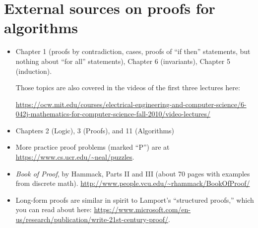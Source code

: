 
\section{External sources on proofs for algorithms}

\begin{itemize}
\item
  \LLM
  Chapter 1 (proofs by contradiction, cases, proofs of ``if then'' statements, but nothing about ``for all'' statements),
  Chapter 6 (invariants),
  Chapter 5 (induction).

  Those topics are also covered in the videos of the first three lectures here:

  \parbox{0.9\textwidth}  {\url{https://ocw.mit.edu/courses/electrical-engineering-and-computer-science/6-042j-mathematics-for-computer-science-fall-2010/video-lectures/}}

\item \MF Chapters 2 (Logic), 3 (Proofs), and 11 (Algorithms)

\item More practice proof problems (marked ``P'') are at
  \url{https://www.cs.ucr.edu/~neal/puzzles}.

\item
  \emph{Book of Proof}, by Hammack, Parts II and III (about 70 pages with examples from discrete math).
  \url{http://www.people.vcu.edu/~rhammack/BookOfProof/}

\item
Long-form proofs are similar in spirit to Lamport's ``structured proofs,''
which you can read about here:
\url{https://www.microsoft.com/en-us/research/publication/write-21st-century-proof/}.

\end{itemize}

